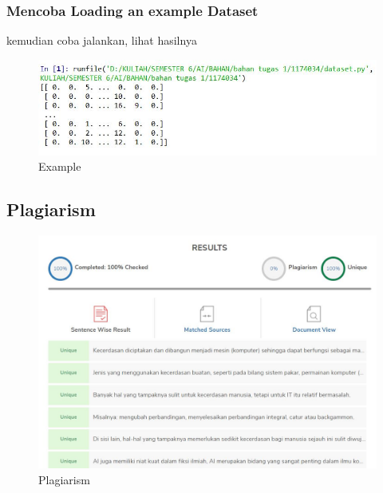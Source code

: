 \subsubsection{Mencoba Loading an example Dataset}

		\par kemudian coba jalankan, lihat hasilnya
		\begin{figure}[H]
		\centering
		\includegraphics[width=1.5\textwidth]{figures/1174034/chapter1/dataset1.png}
		\caption{Example}
		\label{print}
		\end{figure}

\subsection{Plagiarism}
\begin{figure}[H]
\centering
\includegraphics[scale=0.5]{figures/1174034/chapter1/plagiat1.png}
\caption{Plagiarism}
\end{figure}